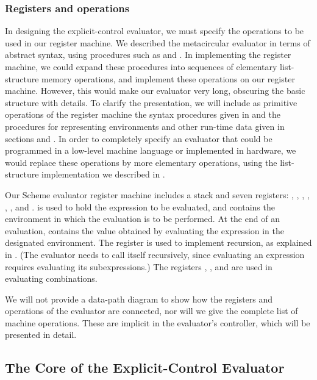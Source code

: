 \subsubsection*{Registers and operations}

In designing the explicit-control evaluator, we must specify the operations to be used in our register machine.
We described the metacircular evaluator in terms of abstract syntax, using procedures such as  and .
In implementing the register machine, we could expand these procedures into sequences of elementary list-structure memory operations, and implement these operations on our register machine.
However, this would make our evaluator very long, obscuring the basic structure with details.
To clarify the presentation, we will include as primitive operations of the register machine the syntax procedures given in  and the procedures for representing environments and other run-time data given in sections  and .
In order to completely specify an evaluator that could be programmed in a low-level machine language or implemented in hardware, we would replace these operations by more elementary operations, using the list-structure implementation we described in .

Our Scheme evaluator register machine includes a stack and seven registers:
, , , , , , and .
 is used to hold the expression to be evaluated, and  contains the environment in which the evaluation is to be performed.
At the end of an evaluation,  contains the value obtained by evaluating the expression in the designated environment.
The  register is used to implement recursion, as explained in .
(The evaluator needs to call itself recursively, since evaluating an expression requires evaluating its subexpressions.)
The registers , , and  are used in evaluating combinations.

We will not provide a data-path diagram to show how the registers and operations of the evaluator are connected, nor will we give the complete list of machine operations.
These are implicit in the evaluator’s controller, which will be presented in detail.



\subsection{The Core of the Explicit-Control Evaluator}
\label{Section 5.4.1}

